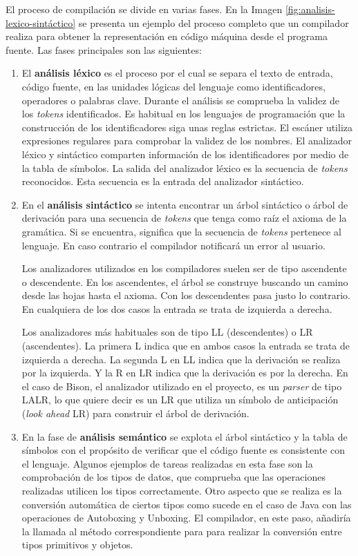 El proceso de compilación se divide en varias fases. En la Imagen \ref{fig:analisis-lexico-sintáctico} se presenta un ejemplo del proceso completo que un compilador realiza para obtener la representación en código máquina desde el programa fuente. Las fases principales son las siguientes:

\begin{enumerate}
    \item El \textbf{análisis léxico} es el proceso por el cual se separa el texto de entrada, código fuente, en las unidades lógicas del lenguaje como identificadores, operadores o palabras clave. 
    Durante el análisis se comprueba la validez de los \emph{tokens} identificados. Es habitual en los lenguajes de programación que la construcción de los identificadores siga unas reglas estrictas. El escáner utiliza expresiones regulares para comprobar la validez de los nombres.
    El analizador léxico y sintáctico comparten información de los identificadores por medio de la tabla de símbolos.
    La salida del analizador léxico es la secuencia de \emph{tokens} reconocidos. Esta secuencia es la entrada del analizador sintáctico.
    
    \item En el \textbf{análisis sintáctico} se intenta encontrar un árbol sintáctico o árbol de derivación para una secuencia de \emph{tokens} que tenga como raíz el axioma de la gramática. Si se encuentra, significa que la secuencia de \emph{tokens} pertenece al lenguaje. En caso contrario el compilador notificará un error al usuario.
    
    Los analizadores utilizados en los compiladores suelen ser de tipo ascendente o descendente. En los ascendentes, el árbol se construye buscando un camino desde las hojas hasta el axioma. Con los descendentes pasa justo lo contrario. En cualquiera de los dos casos la entrada se trata de izquierda a derecha. 
    
    Los analizadores más habituales son de tipo LL (descendentes) o LR (ascendentes). La primera L indica que en ambos casos la entrada se trata de izquierda a derecha. La segunda L en LL indica que la derivación se realiza por la izquierda. Y la R en LR indica que la derivación es por la derecha. En el caso de Bison, el analizador utilizado en el proyecto, es un \emph{parser} de tipo LALR, lo que quiere decir es un LR que utiliza un símbolo de anticipación (\emph{look ahead} LR) para construir el árbol de derivación. 

    \item En la fase de \textbf{análisis semántico} se explota el árbol sintáctico y la tabla de símbolos con el propósito de verificar que el código fuente es consistente con el lenguaje. Algunos ejemplos de tareas realizadas en esta fase son la comprobación de los tipos de datos, que comprueba que las operaciones realizadas utilicen los tipos correctamente. Otro aspecto que se realiza es la conversión automática de ciertos tipos como sucede en el caso de Java con las operaciones de Autoboxing y Unboxing. El compilador, en este paso, añadiría la llamada al método correspondiente para para realizar la conversión entre tipos primitivos y objetos.
    

\end{enumerate}
